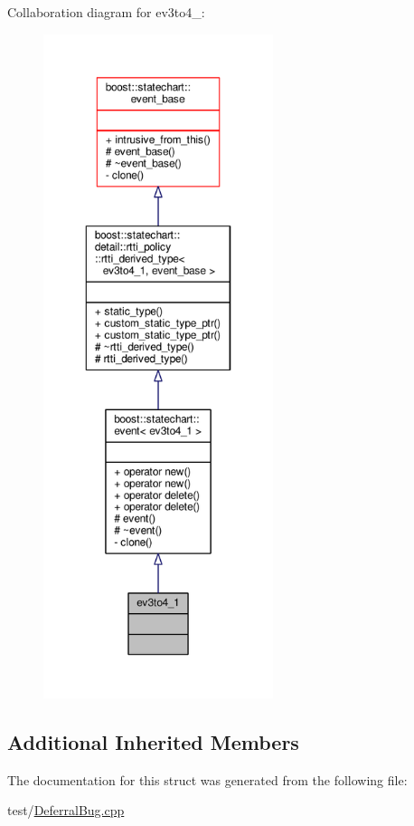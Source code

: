 Collaboration diagram for ev3to4\+\_\+:
\nopagebreak
\begin{figure}[H]
\begin{center}
\leavevmode
\includegraphics[height=550pt]{structev3to4__1__coll__graph}
\end{center}
\end{figure}
\subsection*{Additional Inherited Members}


The documentation for this struct was generated from the following file\+:\begin{DoxyCompactItemize}
\item 
test/\mbox{\hyperlink{_deferral_bug_8cpp}{Deferral\+Bug.\+cpp}}\end{DoxyCompactItemize}
